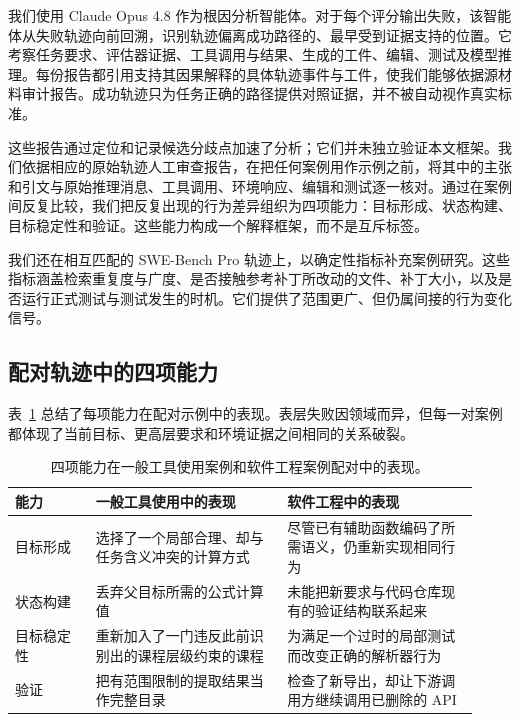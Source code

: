 \documentclass[10pt]{article}
\begin{document}
我们使用 Claude Opus 4.8 作为根因分析智能体。对于每个评分输出失败，该智能体从失败轨迹向前回溯，识别轨迹偏离成功路径的、最早受到证据支持的位置。它考察任务要求、评估器证据、工具调用与结果、生成的工件、编辑、测试及模型推理。每份报告都引用支持其因果解释的具体轨迹事件与工件，使我们能够依据源材料审计报告。成功轨迹只为任务正确的路径提供对照证据，并不被自动视作真实标准。

这些报告通过定位和记录候选分歧点加速了分析；它们并未独立验证本文框架。我们依据相应的原始轨迹人工审查报告，在把任何案例用作示例之前，将其中的主张和引文与原始推理消息、工具调用、环境响应、编辑和测试逐一核对。通过在案例间反复比较，我们把反复出现的行为差异组织为四项能力：目标形成、状态构建、目标稳定性和验证。这些能力构成一个解释框架，而不是互斥标签。

我们还在相互匹配的 SWE-Bench Pro 轨迹上，以确定性指标补充案例研究。这些指标涵盖检索重复度与广度、是否接触参考补丁所改动的文件、补丁大小，以及是否运行正式测试与测试发生的时机。它们提供了范围更广、但仍属间接的行为变化信号。

\subsection{配对轨迹中的四项能力}
\label{sec:capabilities}

表~\ref{tab:manifestations} 总结了每项能力在配对示例中的表现。表层失败因领域而异，但每一对案例都体现了当前目标、更高层要求和环境证据之间相同的关系破裂。

\begin{table}[H]
\centering
\small
\caption{四项能力在一般工具使用案例和软件工程案例配对中的表现。}
\label{tab:manifestations}
\begin{tabular}{p{0.16\linewidth}p{0.38\linewidth}p{0.38\linewidth}}
\toprule
能力 & 一般工具使用中的表现 & 软件工程中的表现 \\
\midrule
目标形成 & 选择了一个局部合理、却与任务含义冲突的计算方式 & 尽管已有辅助函数编码了所需语义，仍重新实现相同行为 \\
\addlinespace
状态构建 & 丢弃父目标所需的公式计算值 & 未能把新要求与代码仓库现有的验证结构联系起来 \\
\addlinespace
目标稳定性 & 重新加入了一门违反此前识别出的课程层级约束的课程 & 为满足一个过时的局部测试而改变正确的解析器行为 \\
\addlinespace
验证 & 把有范围限制的提取结果当作完整目录 & 检查了新导出，却让下游调用方继续调用已删除的 API \\
\bottomrule
\end{tabular}
\end{table}
\end{document}
